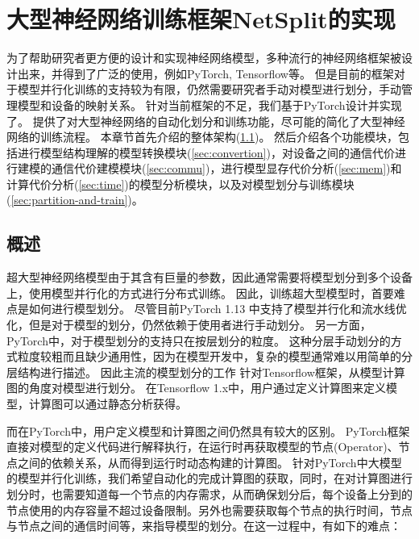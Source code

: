 \chapter{大型神经网络训练框架NetSplit的实现}
\label{chapter:implementation}

为了帮助研究者更方便的设计和实现神经网络模型，多种流行的神经网络框架被设计出来，并得到了广泛的使用，例如PyTorch, Tensorflow等。
但是目前的框架对于模型并行化训练的支持较为有限，仍然需要研究者手动对模型进行划分，手动管理模型和设备的映射关系。
针对当前框架的不足，我们基于PyTorch设计并实现了\sys{}。
\sys{}提供了对大型神经网络的自动化划分和训练功能，尽可能的简化了大型神经网络的训练流程。
本章节首先介绍\sys{}的整体架构(\ref{sec:sys-overview})。
然后介绍各个功能模块，包括进行模型结构理解的模型转换模块(\ref{sec:convertion})，对设备之间的通信代价进行建模的通信代价建模模块(\ref{sec:commu})，进行模型显存代价分析(\ref{sec:mem})和计算代价分析(\ref{sec:time})的模型分析模块，以及对模型划分与训练模块(\ref{sec:partition-and-train})。

\section{\sys{}概述}
\label{sec:sys-overview}
超大型神经网络模型由于其含有巨量的参数，因此通常需要将模型划分到多个设备上，使用模型并行化的方式进行分布式训练。
因此，训练超大型模型时，首要难点是如何进行模型划分。
尽管目前PyTorch 1.13 中支持了模型并行化和流水线优化，但是对于模型的划分，仍然依赖于使用者进行手动划分。
另一方面，PyTorch中，对于模型划分的支持只在按层划分的粒度。
这种分层手动划分的方式粒度较粗而且缺少通用性，因为在模型开发中，复杂的模型通常难以用简单的分层结构进行描述。
因此主流的模型划分的工作 针对Tensorflow框架，从模型计算图的角度对模型进行划分。
在Tensorflow 1.x中，用户通过定义计算图来定义模型，计算图可以通过静态分析获得。

而在PyTorch中，用户定义模型和计算图之间仍然具有较大的区别。
PyTorch框架直接对模型的定义代码进行解释执行，在运行时再获取模型的节点(Operator)、节点之间的依赖关系，从而得到运行时动态构建的计算图。
针对PyTorch中大模型的模型并行化训练，我们希望自动化的完成计算图的获取，同时，在对计算图进行划分时，也需要知道每一个节点的内存需求，从而确保划分后，每个设备上分到的节点使用的内存容量不超过设备限制。另外也需要获取每个节点的执行时间，节点与节点之间的通信时间等，来指导模型的划分。在这一过程中，有如下的难点：

